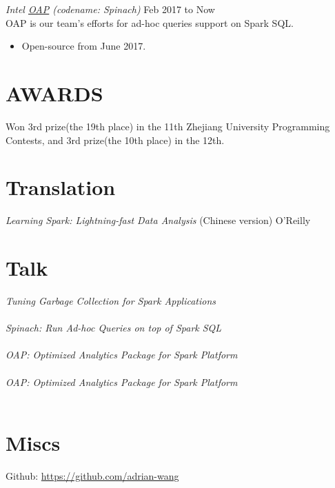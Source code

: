 \documentclass[line,margin]{res}
\begin{document}
\begin{resume}
                 {\sl Intel \href{https://github.com/Intel-bigdata/OAP}{OAP} (codename: Spinach)} \hfill        Feb 2017 to Now\\
                OAP is our team's efforts for ad-hoc queries support on Spark SQL.
                  \begin{itemize}
                   \item Open-source from June 2017.
                   \end{itemize}

\section{AWARDS}
            Won 3rd prize(the 19th place) in the 11th Zhejiang University Programming Contests, and 3rd prize(the 10th place) in the 12th.

\section{Translation}
            {\sl Learning Spark: Lightning-fast Data Analysis} (Chinese version) \hfill O'Reilly

\section{Talk}
            {\sl Tuning Garbage Collection for Spark Applications}\\
                \\
            {\sl Spinach: Run Ad-hoc Queries on top of Spark SQL}\\
                \\
            {\sl OAP: Optimized Analytics Package for Spark Platform}\\
                \\
            {\sl OAP: Optimized Analytics Package for Spark Platform}\\
                \\

\section{Miscs}
            Github: \href{https://github.com/adrian-wang}{https://github.com/adrian-wang}
\end{resume}
\end{document}
